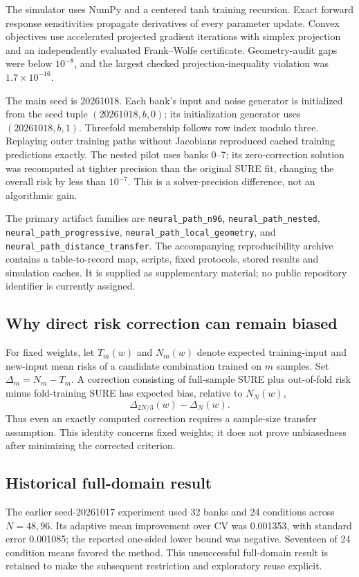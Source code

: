 \documentclass[pdflatex,sn-mathphys-ay]{sn-jnl}
\theoremstyle{remark}\newtheorem{remark}[theorem]{Remark}
\begin{document}
The simulator uses NumPy and a centered tanh training recursion. Exact forward response sensitivities propagate derivatives of every parameter update. Convex objectives use accelerated projected gradient iterations with simplex projection and an independently evaluated Frank--Wolfe certificate. Geometry-audit gaps were below $10^{-8}$, and the largest checked projection-inequality violation was $1.7\times10^{-16}$.

The main seed is 20261018. Each bank's input and noise generator is initialized from the seed tuple $(20261018,b,0)$; its initialization generator uses $(20261018,b,1)$. Threefold membership follows row index modulo three. Replaying outer training paths without Jacobians reproduced cached training predictions exactly. The nested pilot uses banks 0--7; its zero-correction solution was recomputed at tighter precision than the original SURE fit, changing the overall risk by less than $10^{-7}$. This is a solver-precision difference, not an algorithmic gain.

The primary artifact families are \texttt{neural\_path\_n96}, \texttt{neural\_path\_nested}, \texttt{neural\_path\_progressive}, \texttt{neural\_path\_local\_geometry}, and \texttt{neural\_path\_distance\_transfer}. The accompanying reproducibility archive contains a table-to-record map, scripts, fixed protocols, stored results and simulation caches. It is supplied as supplementary material; no public repository identifier is currently assigned.

\subsection{Why direct risk correction can remain biased}
For fixed weights, let $T_m(w)$ and $N_m(w)$ denote expected training-input and new-input mean risks of a candidate combination trained on $m$ samples. Set $\Delta_m=N_m-T_m$. A correction consisting of full-sample SURE plus out-of-fold risk minus fold-training SURE has expected bias, relative to $N_N(w)$,
\[
 \Delta_{2N/3}(w)-\Delta_N(w).
\]
Thus even an exactly computed correction requires a sample-size transfer assumption. This identity concerns fixed weights; it does not prove unbiasedness after minimizing the corrected criterion.

\subsection{Historical full-domain result}
The earlier seed-20261017 experiment used 32 banks and 24 conditions across $N=48,96$. Its adaptive mean improvement over CV was 0.001353, with standard error 0.001085; the reported one-sided lower bound was negative. Seventeen of 24 condition means favored the method. This unsuccessful full-domain result is retained to make the subsequent restriction and exploratory reuse explicit.
\end{document}
